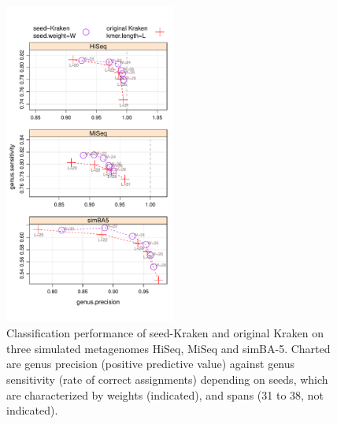 \begin{figure}
	\includegraphics[width=0.5\textwidth]{images/seed-kraken_plt1_bioinfo.pdf}
	\caption{
	Classification performance of {\sc seed-Kraken} 
	and original {\sc Kraken} on three simulated metagenomes HiSeq,
MiSeq 
and simBA-5.
Charted are genus precision (positive predictive value) against genus
sensitivity (rate of correct assignments) depending on seeds, which are characterized by weights (indicated), and spans (31 to 38, not indicated). 
	}
	\label{fig:kraken-experiments}
\end{figure}
